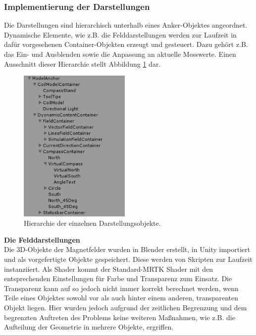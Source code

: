 \subsubsection{Implementierung der Darstellungen}
\label{sec-5-2-2}
Die Darstellungen sind hierarchisch unterhalb eines Anker-Objektes angeordnet. Dynamische Elemente, wie z.B. die Felddarstellungen werden zur Laufzeit in dafür vorgesehenen Container-Objekten erzeugt und gesteuert. Dazu gehört z.B. das Ein- und Ausblenden sowie die Anpassung an aktuelle Messwerte. Einen Ausschnitt dieser Hierarchie stellt Abbildung \ref{img:hirarch} dar.\\

\begin{figure}
	\centering
	\includegraphics[width=0.48\textwidth]{images/unity/hirarchy.jpg}
	\caption{Hierarchie der einzelnen Darstellungsobjekte.}
	\label{img:hirarch}
\end{figure}

\textbf{Die Felddarstellungen}\\
Die 3D-Objekte der Magnetfelder wurden in Blender erstellt, in Unity importiert und als vorgefertigte Objekte gespeichert. Diese werden von Skripten zur Laufzeit instanziiert. Als Shader kommt der Standard-MRTK Shader mit den entsprechenden Einstellungen für Farbe und Transparenz zum Einsatz. Die Transparenz kann auf so jedoch nicht immer korrekt berechnet werden, wenn Teile eines Objektes sowohl vor als auch hinter einem anderen, transparenten Objekt liegen. Hier wurden jedoch aufgrund der zeitlichen Begrenzung und dem begrenzten Auftreten des Problems keine weiteren Maßnahmen, wie z.B. die Aufteilung der Geometrie in mehrere Objekte, ergriffen.\\

